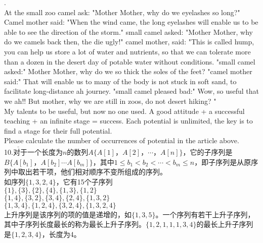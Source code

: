 . \\
\indent At the small zoo camel ask: "Mother Mother, why do we eyelashes so long?" Camel mother said: "When the wind came, the long
    eyelashes will enable us to be able to see the direction of the storm." small camel asked: "Mother Mother, why do we camels back then, the die ugly!" camel mother, said: "This is called hump, you can help us store a lot of water and nutrients, so that we can tolerate more than a dozen in the desert day of potable water without conditions. "small camel asked:" Mother Mother, why do we so thick the soles of the feet? "camel mother said:" That will enable us to many of the body is not stuck in soft sand, to facilitate long-distance ah journey. "small camel pleased bad:" Wow, so useful that we ah!! But mother, why we are still in zoos, do not desert hiking? "\\
\indent My talents to be useful, but now no one used. A good attitude + a successful teaching + an infinite stage = success. Each potential is unlimited, the key is to find a stage for their full potential.\\
\indent Please calculate the number of occurrences of potential in the article above. \\
$\underline{\qquad \qquad }$ \\

\noindent 10.对于一个长度为$n$的数列$A\{A[1]，A[2]，\cdots，A[n]\}$，它的子序列是$B\{A[b_1]，A[b_2]\cdots A[b_m]\}$，其中$1
\leq b_1 < b_2 < \cdots < b_m \leq n$，即子序列是从原序列中取出若干项，他们相对顺序不变所组成的序列。 \\
如序列$\{1,3,2,4\}$，它有15个子序列 \\
$\{1\},\{3\},\{2\},\{4\},\{1,3\},\{1,2\}$ \\
$\{1,4\},\{3,2\},\{3,4\},\{2,4\},\{1,3,2\}$ \\
$\{1,3,4\},\{1,2,4\},\{3,2,4\},\{1,3,2,4\}$ \\
上升序列是该序列的项的值是递增的，如$\{1,3,5\}$。一个序列有若干上升子序列，其中子序列长度最长的称为最长上升子序列。$\{1,2,1,1,1,3,4\}$的最长上升子序列是$\{1,2,3,4\}$，长度为4。 \\

